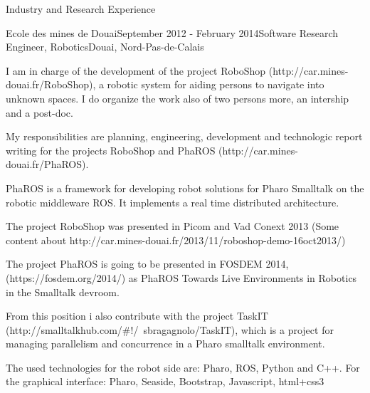 \documentclass{resume} %
\begin{document}
\begin{rSection}{Industry and Research Experience}
\begin{rSubsection}{Ecole des mines de Douai}{September 2012 - February 2014}{Software Research Engineer, Robotics}{Douai, Nord-Pas-de-Calais}
\item I am in charge of the development of the project RoboShop (http://car.mines-douai.fr/RoboShop), a robotic system for aiding persons to navigate into unknown spaces. I do organize the work also of two persons more, an intership and a post-doc.  
\item My responsibilities are planning, engineering, development and technologic report writing for the projects RoboShop and PhaROS (http://car.mines-douai.fr/PhaROS). 
\item PhaROS is a framework for developing robot solutions for Pharo Smalltalk on the robotic middleware ROS. It implements a real time distributed architecture.
\item The project RoboShop was presented in Picom and Vad Conext 2013 (Some content about http://car.mines-douai.fr/2013/11/roboshop-demo-16oct2013/) 
\item The project PhaROS is going to be presented in FOSDEM 2014, (https://fosdem.org/2014/) as PhaROS Towards Live Environments in Robotics in the Smalltalk devroom.
\item From this position i also contribute with the project TaskIT (http://smalltalkhub.com/\#!/~sbragagnolo/TaskIT), which is a project for managing parallelism and concurrence in a Pharo smalltalk environment.
\item The used technologies for the robot side are: Pharo, ROS, Python and C++. For the graphical interface: Pharo, Seaside, Bootstrap, Javascript, html+css3
\end{rSubsection}




\end{rSection}
\end{document}
